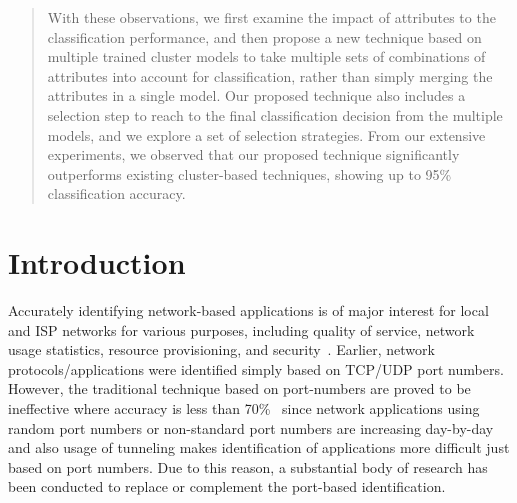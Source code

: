 \documentclass[conference]{IEEEtran}
\begin{document}
\begin{abstract}
With these observations, we first examine the impact of attributes to the classification performance, and then
propose a new technique based on multiple trained cluster models to take multiple sets of combinations of attributes into account for classification, rather than simply merging the attributes in a single model.
Our proposed technique also includes a selection step to reach to the final classification decision from the multiple models, and we explore a set of selection strategies.
From our extensive experiments, we observed that our proposed technique significantly outperforms existing cluster-based techniques, showing up to 95\% classification accuracy.

\end{abstract}





%



\section{Introduction}

Accurately identifying network-based applications is of major interest for local and ISP networks for various purposes, including
quality of service, network usage statistics, resource provisioning, and security~\cite{Bernaille:2006:EAI:1368436.1368445, DBLP:conf/iwcmc/GrimaudoMB12, DBLP:conf/infocom/XieIKFN12}.
Earlier, network protocols/applications were identified simply based on TCP/UDP port numbers.
However, the traditional technique based on port-numbers are proved to be ineffective where accuracy is less than 70\%~\cite{ACAS} since network applications using random port numbers or non-standard port numbers are increasing day-by-day and also usage of tunneling makes identification of applications more difficult just based on port numbers.
Due to this reason, a substantial body of research has been conducted to replace or complement the port-based identification.
\end{document}
